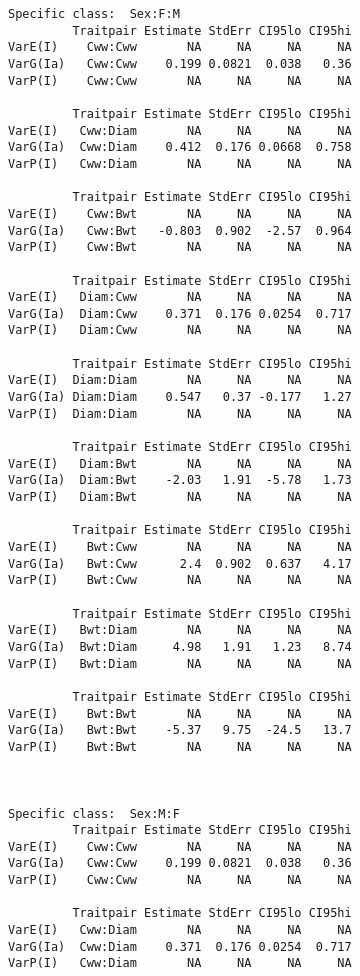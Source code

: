 \documentclass[titlepage]{article}  %
\begin{document}
\begin{verbatim}
Specific class:  Sex:F:M 
         Traitpair Estimate StdErr CI95lo CI95hi
VarE(I)    Cww:Cww       NA     NA     NA     NA
VarG(Ia)   Cww:Cww    0.199 0.0821  0.038   0.36
VarP(I)    Cww:Cww       NA     NA     NA     NA

         Traitpair Estimate StdErr CI95lo CI95hi
VarE(I)   Cww:Diam       NA     NA     NA     NA
VarG(Ia)  Cww:Diam    0.412  0.176 0.0668  0.758
VarP(I)   Cww:Diam       NA     NA     NA     NA

         Traitpair Estimate StdErr CI95lo CI95hi
VarE(I)    Cww:Bwt       NA     NA     NA     NA
VarG(Ia)   Cww:Bwt   -0.803  0.902  -2.57  0.964
VarP(I)    Cww:Bwt       NA     NA     NA     NA

         Traitpair Estimate StdErr CI95lo CI95hi
VarE(I)   Diam:Cww       NA     NA     NA     NA
VarG(Ia)  Diam:Cww    0.371  0.176 0.0254  0.717
VarP(I)   Diam:Cww       NA     NA     NA     NA

         Traitpair Estimate StdErr CI95lo CI95hi
VarE(I)  Diam:Diam       NA     NA     NA     NA
VarG(Ia) Diam:Diam    0.547   0.37 -0.177   1.27
VarP(I)  Diam:Diam       NA     NA     NA     NA

         Traitpair Estimate StdErr CI95lo CI95hi
VarE(I)   Diam:Bwt       NA     NA     NA     NA
VarG(Ia)  Diam:Bwt    -2.03   1.91  -5.78   1.73
VarP(I)   Diam:Bwt       NA     NA     NA     NA

         Traitpair Estimate StdErr CI95lo CI95hi
VarE(I)    Bwt:Cww       NA     NA     NA     NA
VarG(Ia)   Bwt:Cww      2.4  0.902  0.637   4.17
VarP(I)    Bwt:Cww       NA     NA     NA     NA

         Traitpair Estimate StdErr CI95lo CI95hi
VarE(I)   Bwt:Diam       NA     NA     NA     NA
VarG(Ia)  Bwt:Diam     4.98   1.91   1.23   8.74
VarP(I)   Bwt:Diam       NA     NA     NA     NA

         Traitpair Estimate StdErr CI95lo CI95hi
VarE(I)    Bwt:Bwt       NA     NA     NA     NA
VarG(Ia)   Bwt:Bwt    -5.37   9.75  -24.5   13.7
VarP(I)    Bwt:Bwt       NA     NA     NA     NA



Specific class:  Sex:M:F 
         Traitpair Estimate StdErr CI95lo CI95hi
VarE(I)    Cww:Cww       NA     NA     NA     NA
VarG(Ia)   Cww:Cww    0.199 0.0821  0.038   0.36
VarP(I)    Cww:Cww       NA     NA     NA     NA

         Traitpair Estimate StdErr CI95lo CI95hi
VarE(I)   Cww:Diam       NA     NA     NA     NA
VarG(Ia)  Cww:Diam    0.371  0.176 0.0254  0.717
VarP(I)   Cww:Diam       NA     NA     NA     NA


\end{verbatim}
\end{document}

